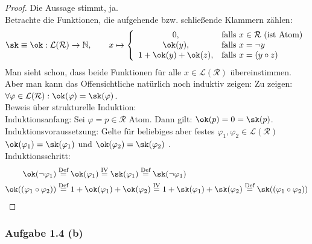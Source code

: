 \begin{proof}
	Die Aussage stimmt, ja.\\
	Betrachte die Funktionen, die aufgehende bzw. schließende Klammern zählen:
	\begin{align*}
		\sk\equiv\ok:\mathcal{L}(\mathcal{R})\to\N,\qquad
		x\mapsto\left\lbrace\begin{array}{cl}
			0, & \falls x\in\mathcal{R}\text{ (ist Atom)}\\
			\ok(y), & \falls x=\neg y\\
			1+\ok(y)+\ok(z), & \falls x=(y\circ z)
		\end{array}\right.
	\end{align*}
	Man sieht schon, dass beide Funktionen für alle $x\in\mathcal{L}(\mathcal{R})$ übereinstimmen. 
	Aber man kann das Offensichtliche natürlich noch induktiv zeigen:\nl
	Zu zeigen: $\forall\varphi\in\mathcal{L}(\mathcal{R}):\ok(\varphi)=\sk(\varphi)$.\\
	Beweis über strukturelle Induktion:\\
	Induktionsanfang: Sei $\varphi=p\in\mathcal{R}$ Atom. Dann gilt: $\ok(p)=0=\sk(p)$.\\
	Induktionsvoraussetzung: Gelte für beliebiges aber festes 
	$\varphi_1,\varphi_2\in\mathcal{L}(\mathcal{R})$\\ $\ok(\varphi_1)=\sk(\varphi_1)$ und $\ok(\varphi_2)=\sk(\varphi_2)$ .\\ 
	Induktionsschritt:
	\begin{align*}
		\ok(\neg \varphi_1)
		&\stackeq{\text{Def}}\ok(\varphi_1)
		\stackeq{\text{IV}}\sk(\varphi_1)
		\stackeq{\text{Def}}\sk(\neg \varphi_1)\\
		\ok((\varphi_1\circ \varphi_2))
		&\stackeq{\text{Def}}1+\ok(\varphi_1)+\ok(\varphi_2)
		\stackeq{\text{IV}}1+\sk(\varphi_1)+\sk(\varphi_2)
		\stackeq{\text{Def}}\sk((\varphi_1\circ \varphi_2))
	\end{align*}
\end{proof}

\subsubsection{Aufgabe 1.4 (b)}

